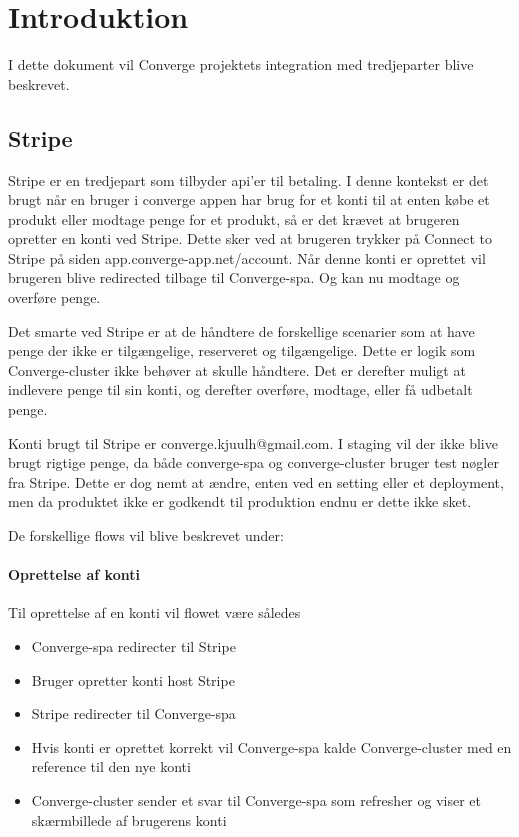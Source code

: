 \chapter{Introduktion}

I dette dokument vil Converge projektets integration med tredjeparter blive beskrevet.

\section{Stripe}

Stripe er en tredjepart som tilbyder api'er til betaling. I denne kontekst er det brugt når en bruger i converge appen har brug for et konti til at enten købe et produkt eller modtage penge for et produkt, så er det krævet at brugeren opretter en konti ved Stripe. Dette sker ved at brugeren trykker på Connect to Stripe på siden app.converge-app.net/account. Når denne konti er oprettet vil brugeren blive redirected tilbage til Converge-spa. Og kan nu modtage og overføre penge.

Det smarte ved Stripe er at de håndtere de forskellige scenarier som at have penge der ikke er tilgængelige, reserveret og tilgængelige. Dette er logik som Converge-cluster ikke behøver at skulle håndtere. Det er derefter muligt at indlevere penge til sin konti, og derefter overføre, modtage, eller få udbetalt penge.

Konti brugt til Stripe er converge.kjuulh@gmail.com. I staging vil der ikke blive brugt rigtige penge, da både converge-spa og converge-cluster bruger test nøgler fra Stripe. Dette er dog nemt at ændre, enten ved en setting eller et deployment, men da produktet ikke er godkendt til produktion endnu er dette ikke sket.

De forskellige flows vil blive beskrevet under:

\subsubsection{Oprettelse af konti}

Til oprettelse af en konti vil flowet være således

\begin{itemize}
    \item Converge-spa redirecter til Stripe
    \item Bruger opretter konti host Stripe
    \item Stripe redirecter til Converge-spa
    \item Hvis konti er oprettet korrekt vil Converge-spa kalde Converge-cluster med en reference til den nye konti
    \item Converge-cluster sender et svar til Converge-spa som refresher og viser et skærmbillede af brugerens konti
\end{itemize}

